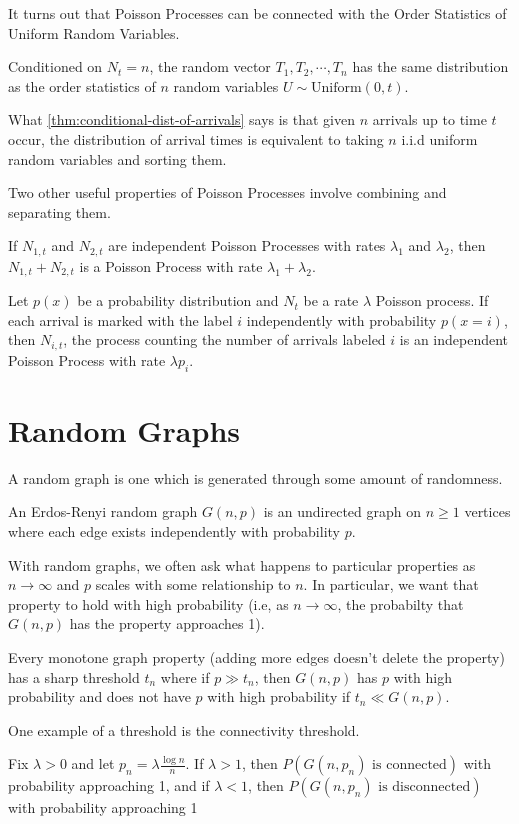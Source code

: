 It turns out that Poisson Processes can be connected with the Order Statistics of Uniform Random Variables.
\begin{theorem}
	Conditioned on $N_t = n$, the random vector $T_1, T_2, \cdots, T_n$ has the same distribution as the order statistics of $n$ random variables $U\sim \text{Uniform}(0, t)$.
	\label{thm:conditional-dist-of-arrivals}
\end{theorem}
What \cref{thm:conditional-dist-of-arrivals} says is that given $n$ arrivals up to time $t$ occur, the distribution of arrival times is equivalent to taking $n$ i.i.d uniform random variables and sorting them.

Two other useful properties of Poisson Processes involve combining and separating them.
\begin{theorem}
	If $N_{1,t}$ and $N_{2,t}$ are independent Poisson Processes with rates $\lambda_1$ and $\lambda_2$, then $N_{1, t} + N_{2,t}$ is a Poisson Process with rate $\lambda_1+\lambda_2$.
	\label{thm:poisson-merging}
\end{theorem}
\begin{theorem}
	Let $p(x)$ be a probability distribution and $N_t$ be a rate $\lambda$ Poisson process. If each arrival is marked with the label $i$ independently with probability $p(x=i)$, then $N_{i,t}$, the process counting the number of arrivals labeled $i$ is an independent Poisson Process with rate $\lambda p_i$.
	\label{thm:poisson-splitting}
\end{theorem}
\section{Random Graphs}
A random graph is one which is generated through some amount of randomness.
\begin{definition}
	An Erdos-Renyi random graph $G(n, p)$ is an undirected graph on $n \geq 1$ vertices where each edge exists independently with probability $p$.
	\label{defn:erdos-renyi}
\end{definition}
With random graphs, we often ask what happens to particular properties as $n\to\infty$ and $p$ scales with some relationship to $n$.
In particular, we want that property to hold with high probability (i.e, as $n\to\infty$, the probabilty that $G(n,p)$ has the property approaches 1).
\begin{theorem}
	Every monotone graph property (adding more edges doesn't delete the property) has a sharp threshold $t_n$ where if $p	\gg t_n$, then $G(n, p)$ has $p$ with high probability and does not have $p$ with high probability if $t_n \ll G(n,p)$.
	\label{thm:graph-sharp-threshold}
\end{theorem}
One example of a threshold is the connectivity threshold.
\begin{theorem}
	Fix $\lambda > 0$ and let $p_n = \lambda \frac{\log n}{n}$. If $\lambda > 1$, then $P(G(n,p_n)\text{ is connected})$ with probability approaching 1, and if $\lambda < 1$, then $P(G(n,p_n)\text{ is disconnected})$ with probability approaching 1
	\label{thm:erdos-renyi}
\end{theorem}
